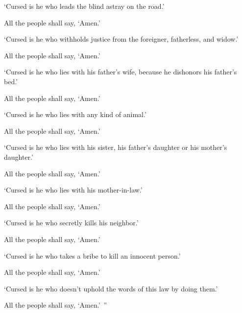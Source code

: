 {\par }{\PP {}‘Cursed is he who leads the blind astray on the road.’
\par }{\PP All the people shall say, ‘Amen.’
\par }{\PP {}‘Cursed is he who withholds justice from the foreigner, fatherless, and widow.’
\par }{\PP All the people shall say, ‘Amen.’
\par }{\PP {}‘Cursed is he who lies with his father’s wife, because he dishonors his father’s bed.’
\par }{\PP All the people shall say, ‘Amen.’
\par }{\PP {}‘Cursed is he who lies with any kind of animal.’
\par }{\PP All the people shall say, ‘Amen.’
\par }{\PP {}‘Cursed is he who lies with his sister, his father’s daughter or his mother’s daughter.’
\par }{\PP All the people shall say, ‘Amen.’
\par }{\PP {}‘Cursed is he who lies with his mother-in-law.’
\par }{\PP All the people shall say, ‘Amen.’
\par }{\PP {}‘Cursed is he who secretly kills his neighbor.’
\par }{\PP All the people shall say, ‘Amen.’
\par }{\PP {}‘Cursed is he who takes a bribe to kill an innocent person.’
\par }{\PP All the people shall say, ‘Amen.’
\par }{\PP {}‘Cursed is he who doesn’t uphold the words of this law by doing them.’
\par }{\PP All the people shall say, ‘Amen.’ ”

}
